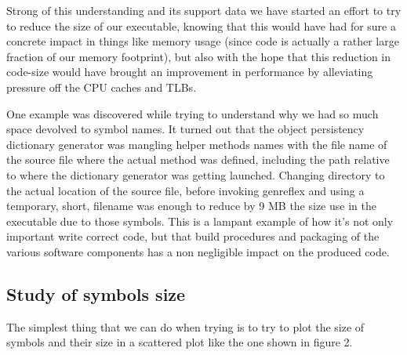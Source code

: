 \documentclass[a4paper]{jpconf}
\begin{document}
Strong of this understanding and its support data we have started an effort to try to reduce the size of our executable, knowing that this would have had for sure a concrete impact in things like memory usage (since code is actually a rather large fraction of our memory footprint), but also with the hope that this reduction in code-size would have brought an improvement in performance by alleviating pressure off the CPU caches and TLBs.


One example was discovered while trying to understand why we had so much space devolved to symbol names. It turned out that the object persistency dictionary generator was mangling helper methods names with the file name of the source file where the actual method was defined, including the path relative to where the dictionary generator was getting launched. Changing directory to the actual location of the source file, before invoking genreflex and using a temporary, short, filename was enough to reduce by 9 MB the size use in the executable due to those symbols. This is a lampant example of how it's not only important write correct code, but that build procedures and packaging of the various software components has a non negligible impact on the produced code.


\subsection{Study of symbols size}
\label{studyofsymbolssize}

The simplest thing that we can do when trying is to try to plot the size of symbols and their size in a scattered plot like the one shown in figure 2.


\begin{figure}
\caption{}
\label{}
\begin{center}
\end{center}
\end{figure}
\end{document}
